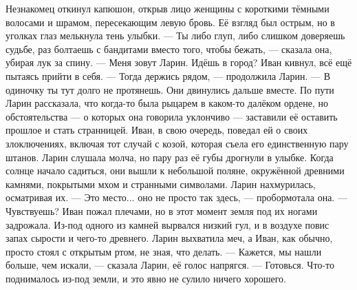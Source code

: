 \documentclass[12pt,a4paper]{book}
\begin{document}
Незнакомец откинул капюшон, открыв лицо женщины с короткими тёмными волосами и шрамом, пересекающим левую бровь. Её взгляд был острым, но в уголках глаз мелькнула тень улыбки.
— Ты либо глуп, либо слишком доверяешь судьбе, раз болтаешь с бандитами вместо того, чтобы бежать, — сказала она, убирая лук за спину. — Меня зовут Ларин. Идёшь в город?
Иван кивнул, всё ещё пытаясь прийти в себя.
— Тогда держись рядом, — продолжила Ларин. — В одиночку ты тут долго не протянешь.
Они двинулись дальше вместе. По пути Ларин рассказала, что когда-то была рыцарем в каком-то далёком ордене, но обстоятельства — о которых она говорила уклончиво — заставили её оставить прошлое и стать странницей. Иван, в свою очередь, поведал ей о своих злоключениях, включая тот случай с козой, которая съела его единственную пару штанов. Ларин слушала молча, но пару раз её губы дрогнули в улыбке.
Когда солнце начало садиться, они вышли к небольшой поляне, окружённой древними камнями, покрытыми мхом и странными символами. Ларин нахмурилась, осматривая их.
— Это место... оно не просто так здесь, — пробормотала она. — Чувствуешь?
Иван пожал плечами, но в этот момент земля под их ногами задрожала. Из-под одного из камней вырвался низкий гул, и в воздухе повис запах сырости и чего-то древнего. Ларин выхватила меч, а Иван, как обычно, просто стоял с открытым ртом, не зная, что делать.
— Кажется, мы нашли больше, чем искали, — сказала Ларин, её голос напрягся. — Готовься.
Что-то поднималось из-под земли, и это явно не сулило ничего хорошего.
\end{document}
